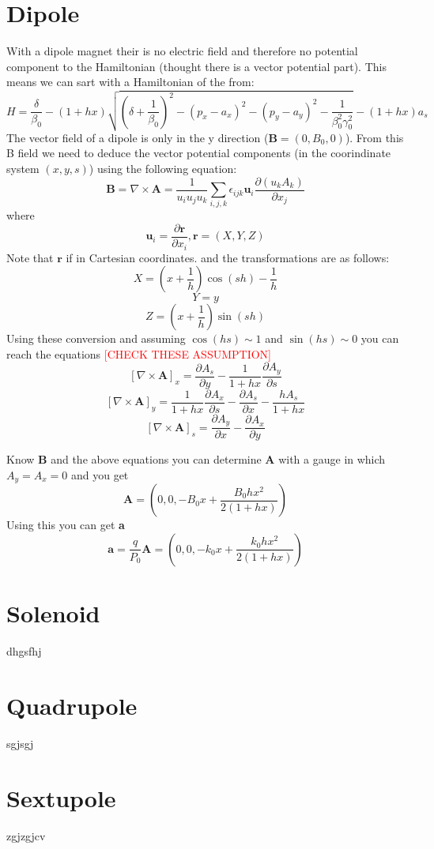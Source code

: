 \documentclass[11pt,a4paper]{article}
\begin{document}
	\section{Dipole}
	With a dipole magnet their is no electric field and therefore no potential component to the Hamiltonian (thought there is a vector potential part). This means we can sart with a Hamiltonian of the from:
	\[
	H=\frac{\delta}{\beta_0}-(1+hx)\sqrt{(\delta+\frac{1}{\beta_0})^2-(p_x-a_x)^2-(p_y-a_y)^2-\frac{1}{\beta_0^2\gamma_0^2}}-(1+hx)a_s
	\]	
	The vector field of a dipole is only in the y direction ($\textbf{B}=(0,B_0,0)$).  From this B field we need to deduce the vector potential components (in the coorindinate system $(x,y,s)$) using the following equation:
	\[
	\textbf{B}=\nabla \times \textbf{A}=\frac{1}{u_iu_ju_k}\sum_{i,j,k}\epsilon_{ijk}\textbf{u}_i\frac{\partial(u_kA_k)}{\partial x_j}
	\]
	where
	\[ 
	\textbf{u}_i=\frac{\partial \textbf{r}}{\partial x_i}, \textbf{r}=(X,Y,Z)
	 \]
	 Note that $\textbf{r}$ if in Cartesian coordinates. and the transformations are as follows:
	 \[X=(x+\frac{1}{h})\cos(sh)-\frac{1}{h}\]
	 \[Y=y \]
	 \[Z=(x+\frac{1}{h})\sin(sh) \]
	  Using these conversion and assuming $\cos(hs)\sim 1$ and $\sin(hs)\sim 0$ you can reach the equations \textcolor{red}{[CHECK THESE ASSUMPTION]}
	  \[ [\nabla \times \textbf{A}]_x=\frac{\partial A_s}{\partial y}-\frac{1}{1+hx}\frac{\partial A_y}{\partial s}\]
	  \[ [\nabla \times \textbf{A}]_y=\frac{1}{1+hx}\frac{\partial A_x}{\partial s}-\frac{\partial A_s}{\partial x}-\frac{hA_s}{1+hx}  \]	
	  \[ [\nabla \times \textbf{A}]_s=\frac{\partial A_y}{\partial x}-\frac{\partial A_x}{\partial y}  \]	
	  
	  Know \textbf{B} and the above equations you can determine \textbf{A} with a gauge in which $A_y=A_x=0$ and you get 
	  \[ \textbf{A}=(0,0,-B_0x+\frac{B_0hx^2}{2(1+hx)}) \]
	  Using this you can get \textbf{a} 
	  \[ \textbf{a}=\frac{q}{P_0}\textbf{A}=(0,0,-k_0x+\frac{k_0hx^2}{2(1+hx)}) \]
	  
	   
	 
	\section{Solenoid}
	dhgsfhj

	\section{Quadrupole}
	sgjsgj
	\section{Sextupole}
	zgjzgjcv
\end{document}
